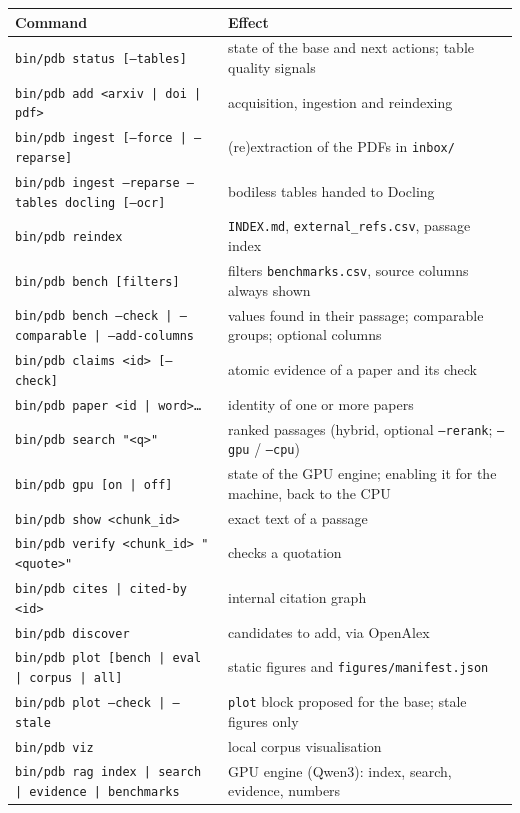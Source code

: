\documentclass[11pt,a4paper]{article}
\newcommand{\cmd}[1]{\texttt{#1}}
\begin{document}
\begin{center}
\small
\begin{tabularx}{\linewidth}{@{}lL@{}}
\toprule
Command & Effect \\
\midrule
\cmd{bin/pdb status [--tables]} & state of the base and next actions; table quality signals \\
\cmd{bin/pdb add <arxiv | doi | pdf>} & acquisition, ingestion and reindexing \\
\cmd{bin/pdb ingest [--force | --reparse]} & (re)extraction of the PDFs in \cmd{inbox/} \\
\cmd{bin/pdb ingest --reparse --tables docling [--ocr]} & bodiless tables handed to Docling \\
\cmd{bin/pdb reindex} & \cmd{INDEX.md}, \cmd{external\_refs.csv}, passage index \\
\cmd{bin/pdb bench [filters]} & filters \cmd{benchmarks.csv}, source columns always shown \\
\cmd{bin/pdb bench --check | --comparable | --add-columns} & values found in their passage; comparable groups; optional columns \\
\cmd{bin/pdb claims <id> [--check]} & atomic evidence of a paper and its check \\
\cmd{bin/pdb paper <id | word>…} & identity of one or more papers \\
\cmd{bin/pdb search "<q>"} & ranked passages (hybrid, optional \cmd{--rerank}; \cmd{--gpu} / \cmd{--cpu}) \\
\cmd{bin/pdb gpu [on | off]} & state of the GPU engine; enabling it for the machine, back to the CPU \\
\cmd{bin/pdb show <chunk\_id>} & exact text of a passage \\
\cmd{bin/pdb verify <chunk\_id> "<quote>"} & checks a quotation \\
\cmd{bin/pdb cites | cited-by <id>} & internal citation graph \\
\cmd{bin/pdb discover} & candidates to add, via OpenAlex \\
\cmd{bin/pdb plot [bench | eval | corpus | all]} & static figures and \cmd{figures/manifest.json} \\
\cmd{bin/pdb plot --check | --stale} & \cmd{plot} block proposed for the base; stale figures only \\
\cmd{bin/pdb viz} & local corpus visualisation \\
\cmd{bin/pdb rag index | search | evidence | benchmarks} & GPU engine (Qwen3): index, search, evidence, numbers \\

\end{tabularx}
\end{center}
\end{document}
